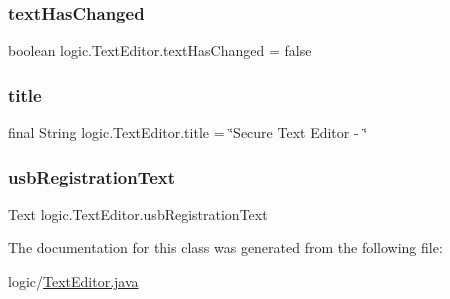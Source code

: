\subsubsection{\texorpdfstring{text\+Has\+Changed}{textHasChanged}}
{\footnotesize\ttfamily boolean logic.\+Text\+Editor.\+text\+Has\+Changed = false\hspace{0.3cm}{\ttfamily [private]}}

\mbox{\label{classlogic_1_1_text_editor_a86db3912b74760463213b2936f20f08f}} 
\subsubsection{\texorpdfstring{title}{title}}
{\footnotesize\ttfamily final String logic.\+Text\+Editor.\+title = \char`\"{}Secure Text Editor -\/ \char`\"{}}

\mbox{\label{classlogic_1_1_text_editor_ac75c41480833a18c2cfd0f569cf10a45}} 
\subsubsection{\texorpdfstring{usb\+Registration\+Text}{usbRegistrationText}}
{\footnotesize\ttfamily Text logic.\+Text\+Editor.\+usb\+Registration\+Text\hspace{0.3cm}{\ttfamily [private]}}



The documentation for this class was generated from the following file\+:\begin{DoxyCompactItemize}
\item 
logic/\mbox{\hyperlink{_text_editor_8java}{Text\+Editor.\+java}}\end{DoxyCompactItemize}

